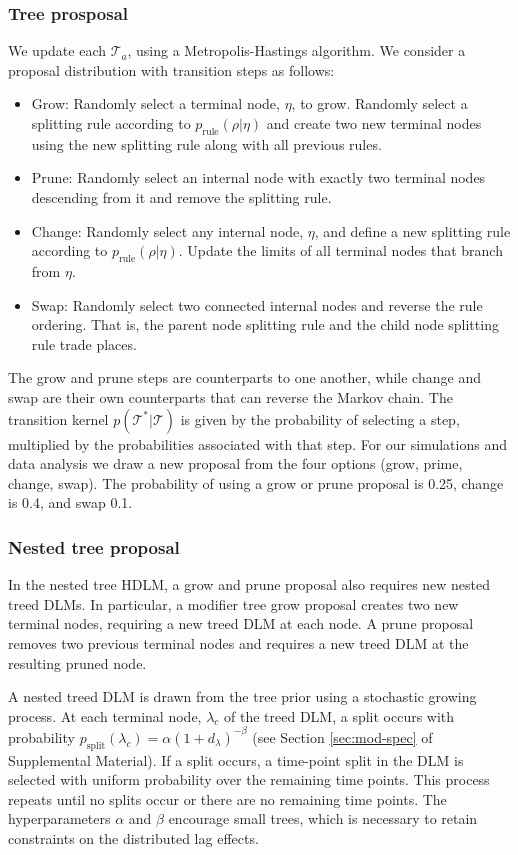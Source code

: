 \documentclass[12pt]{article}
\begin{document}
\subsubsection{Tree prosposal}
We update each $\mathcal{T}_{a}$, using a Metropolis-Hastings algorithm. We consider a proposal distribution with transition steps as follows:
\begin{itemize}
    \item Grow: Randomly select a terminal node, $\eta$, to grow. Randomly select a splitting rule according to $p_{\text{rule}}(\rho|\eta)$ and create two new terminal nodes using the new splitting rule along with all previous rules.
    \item Prune: Randomly select an internal node with exactly two terminal nodes descending from it and remove the splitting rule.
    \item Change: Randomly select any internal node, $\eta$, and define a new splitting rule according to $p_{\text{rule}}(\rho|\eta)$. Update the limits of all terminal nodes that branch from $\eta$.
    \item Swap: Randomly select two connected internal nodes and reverse the rule ordering. That is, the parent node splitting rule and the child node splitting rule trade places.
\end{itemize}

The grow and prune steps are counterparts to one another, while change and swap are their own counterparts that can reverse the Markov chain. The transition kernel $p(\mathcal{T}^*|\mathcal{T})$ is given by the probability of selecting a step, multiplied by the probabilities associated with that step. For our simulations and data analysis we draw a new proposal from the four options (grow, prime, change, swap). The probability of using a grow or prune proposal is 0.25, change is 0.4, and swap 0.1.

\subsubsection{Nested tree proposal}
In the nested tree HDLM, a grow and prune proposal also requires new nested treed DLMs. In particular, a modifier tree grow proposal creates two new terminal nodes, requiring a new treed DLM at each node. A prune proposal removes two previous terminal nodes and requires a new treed DLM at the resulting pruned node.

A nested treed DLM is drawn from the tree prior using a stochastic growing process. At each terminal node, $\lambda_c$ of the treed DLM, a split occurs with probability $p_{\text{split}}(\lambda_c)=\alpha(1+d_\lambda)^{-\beta}$ (see Section \ref{sec:mod-spec} of Supplemental Material). If a split occurs, a time-point split in the DLM is selected with uniform probability over the remaining time points. This process repeats until no splits occur or there are no remaining time points. The hyperparameters $\alpha$ and $\beta$ encourage small trees, which is necessary to retain constraints on the distributed lag effects. 
\end{document}
